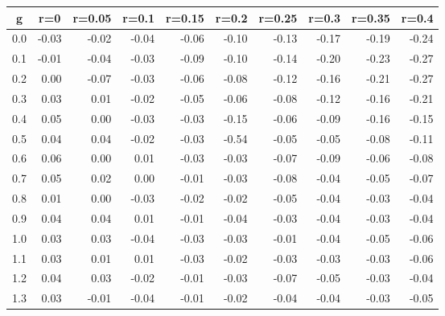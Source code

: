 %
\begin{table}[!tbp]
 \begin{center}
 \begin{tabular}{rrrrrrrrrr}\hline\hline
\multicolumn{1}{c}{g}&\multicolumn{1}{c}{r=0}&\multicolumn{1}{c}{r=0.05}&\multicolumn{1}{c}{r=0.1}&\multicolumn{1}{c}{r=0.15}&\multicolumn{1}{c}{r=0.2}&\multicolumn{1}{c}{r=0.25}&\multicolumn{1}{c}{r=0.3}&\multicolumn{1}{c}{r=0.35}&\multicolumn{1}{c}{r=0.4}\tabularnewline
\hline
0.0&-0.03&-0.02&-0.04&-0.06&-0.10&-0.13&-0.17&-0.19&-0.24\tabularnewline
0.1&-0.01&-0.04&-0.03&-0.09&-0.10&-0.14&-0.20&-0.23&-0.27\tabularnewline
0.2& 0.00&-0.07&-0.03&-0.06&-0.08&-0.12&-0.16&-0.21&-0.27\tabularnewline
0.3& 0.03& 0.01&-0.02&-0.05&-0.06&-0.08&-0.12&-0.16&-0.21\tabularnewline
0.4& 0.05& 0.00&-0.03&-0.03&-0.15&-0.06&-0.09&-0.16&-0.15\tabularnewline
0.5& 0.04& 0.04&-0.02&-0.03&-0.54&-0.05&-0.05&-0.08&-0.11\tabularnewline
0.6& 0.06& 0.00& 0.01&-0.03&-0.03&-0.07&-0.09&-0.06&-0.08\tabularnewline
0.7& 0.05& 0.02& 0.00&-0.01&-0.03&-0.08&-0.04&-0.05&-0.07\tabularnewline
0.8& 0.01& 0.00&-0.03&-0.02&-0.02&-0.05&-0.04&-0.03&-0.04\tabularnewline
0.9& 0.04& 0.04& 0.01&-0.01&-0.04&-0.03&-0.04&-0.03&-0.04\tabularnewline
1.0& 0.03& 0.03&-0.04&-0.03&-0.03&-0.01&-0.04&-0.05&-0.06\tabularnewline
1.1& 0.03& 0.01& 0.01&-0.03&-0.02&-0.03&-0.03&-0.03&-0.06\tabularnewline
1.2& 0.04& 0.03&-0.02&-0.01&-0.03&-0.07&-0.05&-0.03&-0.04\tabularnewline
1.3& 0.03&-0.01&-0.04&-0.01&-0.02&-0.04&-0.04&-0.03&-0.05\tabularnewline
\hline
\end{tabular}

\end{center}

\end{table}

